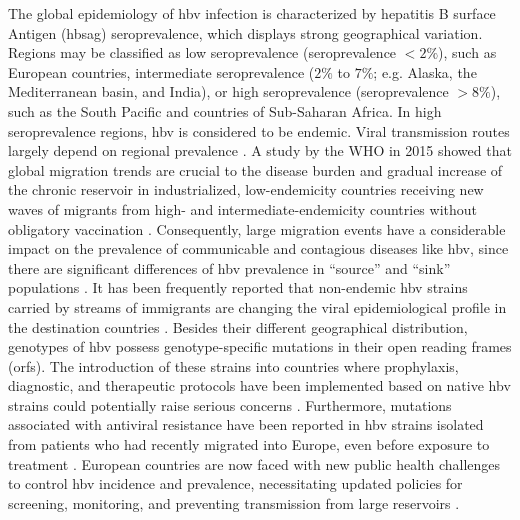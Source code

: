 The global epidemiology of \gls{hbv} infection is characterized by hepatitis B surface Antigen (\gls{hbsag}) seroprevalence, which displays strong geographical variation.
Regions may be classified as low seroprevalence (seroprevalence $< 2\%$), such as European countries, intermediate seroprevalence ($2\%$ to $7\%$; e.g. Alaska, the Mediterranean basin, and India), or high seroprevalence (seroprevalence $> 8\%$), such as the South Pacific and countries of Sub-Saharan Africa.
In high seroprevalence regions, \gls{hbv} is considered to be endemic.
Viral transmission routes largely depend on regional prevalence \citep{pourkarim2011molecular}.
A study by the WHO in 2015 showed that global migration trends are crucial to the disease burden and gradual increase of the chronic reservoir in industrialized, low-endemicity countries receiving new waves of migrants from high- and intermediate-endemicity countries without obligatory vaccination \citep{sharma2015immigration}.
Consequently, large migration events have a considerable impact on the prevalence of communicable and contagious diseases like \gls{hbv}, since there are significant differences of \gls{hbv} prevalence in ``source'' and ``sink'' populations \citep{chu2013changing}.
It has been frequently reported that non-endemic \gls{hbv} strains carried by streams of immigrants are changing the viral epidemiological profile in the destination countries \citep{pourkarim2011molecular,chu2013changing,khan2008transmission,mina201715,coppola2017hepatitis,thijssen2019mass}.
Besides their different geographical distribution, genotypes of \gls{hbv} possess genotype-specific mutations in their open reading frames (\gls{orf}s).
The introduction of these strains into countries where prophylaxis, diagnostic, and therapeutic protocols have been implemented based on native \gls{hbv} strains could potentially raise serious concerns \citep{lampertico2015optimal,velkov2020global,limeres2019impact}.
Furthermore, mutations associated with antiviral resistance have been reported in \gls{hbv} strains isolated from patients who had recently migrated into Europe, even before exposure to treatment \citep{bottecchia2011detection,selabe2007mutations}.
European countries are now faced with new public health challenges to control \gls{hbv} incidence and prevalence, necessitating updated policies for screening, monitoring, and preventing transmission from large reservoirs \citep{schweitzer2015estimations,thijssen2019mass}.

